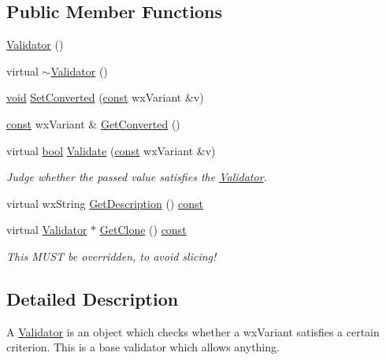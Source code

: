 \subsection*{Public Member Functions}
\begin{DoxyCompactItemize}
\item 
\hyperlink{class_validator_a5059febd30a909b60107c591fe72eaca}{Validator} ()
\item 
virtual \hyperlink{class_validator_a4270e7ebf0c451ff80b4ec6fd8eb6a42}{$\sim$\+Validator} ()
\item 
\hyperlink{sound_8c_ae35f5844602719cf66324f4de2a658b3}{void} \hyperlink{class_validator_a62e4932a4baa3a613eaa600e8de06884}{Set\+Converted} (\hyperlink{getopt1_8c_a2c212835823e3c54a8ab6d95c652660e}{const} wx\+Variant \&v)
\item 
\hyperlink{getopt1_8c_a2c212835823e3c54a8ab6d95c652660e}{const} wx\+Variant \& \hyperlink{class_validator_ab591b180850b842f5fef8a67dbd34d4b}{Get\+Converted} ()
\item 
virtual \hyperlink{mac_2config_2i386_2lib-src_2libsoxr_2soxr-config_8h_abb452686968e48b67397da5f97445f5b}{bool} \hyperlink{class_validator_af3894f81595f2ce9d5c18c875a4a9472}{Validate} (\hyperlink{getopt1_8c_a2c212835823e3c54a8ab6d95c652660e}{const} wx\+Variant \&v)
\begin{DoxyCompactList}\small\item\em Judge whether the passed value satisfies the \hyperlink{class_validator}{Validator}. \end{DoxyCompactList}\item 
virtual wx\+String \hyperlink{class_validator_a5e73a3e1ec8e85c8775e0ec8daff78ec}{Get\+Description} () \hyperlink{getopt1_8c_a2c212835823e3c54a8ab6d95c652660e}{const} 
\item 
virtual \hyperlink{class_validator}{Validator} $\ast$ \hyperlink{class_validator_ac291bdff33811028026d746517da8a76}{Get\+Clone} () \hyperlink{getopt1_8c_a2c212835823e3c54a8ab6d95c652660e}{const} 
\begin{DoxyCompactList}\small\item\em This M\+U\+ST be overridden, to avoid slicing! \end{DoxyCompactList}\end{DoxyCompactItemize}


\subsection{Detailed Description}
A \hyperlink{class_validator}{Validator} is an object which checks whether a wx\+Variant satisfies a certain criterion. This is a base validator which allows anything. 

